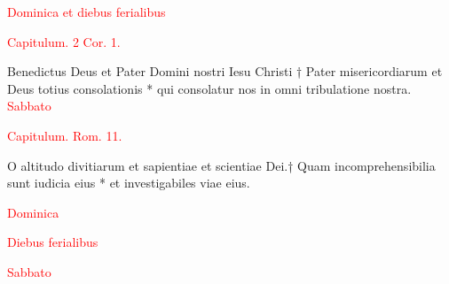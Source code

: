 

\noindent\textcolor{red}{Dominica et diebus ferialibus}
\begin{center}
 \noindent\textcolor{red}{Capitulum. 2 Cor. 1.}\\
\end{center}
Benedictus Deus et Pater Domini nostri Iesu Christi † Pater misericordiarum et Deus totius consolationis * qui consolatur nos in omni tribulatione nostra.\\

\noindent\textcolor{red}{Sabbato}
\begin{center}
 \noindent\textcolor{red}{Capitulum. Rom. 11.}\\
\end{center}
O altitudo divitiarum et sapientiae et scientiae Dei.† Quam incomprehensibilia sunt iudicia eius * et investigabiles viae eius.\\

\vspace{0.5cm}

\noindent\textcolor{red}{Dominica}\\

\noindent\textcolor{red}{Diebus ferialibus}\\

\noindent\textcolor{red}{Sabbato}\\
\vspace{0.7cm}



